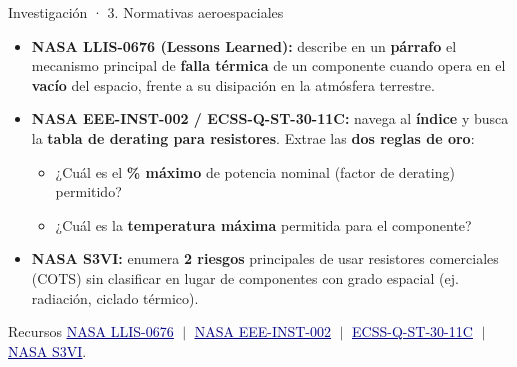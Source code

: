 \documentclass[aspectratio=169]{beamer}
\newcommand{\enlace}[2]{\href{#1}{\textcolor{navy}{\underline{#2}}}}
\begin{document}
\begin{frame}{Investigación · 3. Normativas aeroespaciales}
  \begin{itemize}
    \item \textbf{NASA LLIS-0676 (Lessons Learned):} describe en un \textbf{párrafo} el
      mecanismo principal de \textbf{falla térmica} de un componente cuando opera en el
      \textbf{vacío} del espacio, frente a su disipación en la atmósfera terrestre.
    \item \textbf{NASA EEE-INST-002 / ECSS-Q-ST-30-11C:} navega al \textbf{índice} y busca
      la \textbf{tabla de derating para resistores}. Extrae las \textbf{dos reglas de oro}:
      \begin{itemize}
        \item ¿Cuál es el \textbf{\% máximo} de potencia nominal (factor de derating) permitido?
        \item ¿Cuál es la \textbf{temperatura máxima} permitida para el componente?
      \end{itemize}
    \item \textbf{NASA S3VI:} enumera \textbf{2 riesgos} principales de usar resistores
      comerciales (COTS) sin clasificar en lugar de componentes con grado espacial
      (ej. radiación, ciclado térmico).
  \end{itemize}
  \pause
  \begin{block}{Recursos}
    \small
    \enlace{https://llis.nasa.gov/lesson/676}{NASA LLIS-0676}
    $\;|\;$ \enlace{https://snebulos.mit.edu/projects/reference/NASA-Generic/EEE-INST-002-DeratingPages.pdf}{NASA EEE-INST-002}
    $\;|\;$ \enlace{https://ecss.nl/standard/ecss-q-st-30-11c-derating-eee-components/}{ECSS-Q-ST-30-11C}
    $\;|\;$ \enlace{https://s3vi.ndc.nasa.gov/ssri-kb/static/resources/electronic-circuit-design-and-analysis-for-space-applications.pdf}{NASA S3VI}.
  \end{block}
\end{frame}
\end{document}
